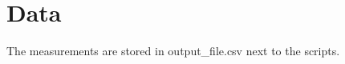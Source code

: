 \documentclass{article}
\begin{document}
\section{Data}
The measurements are stored in output_file.csv next to the scripts.
\end{document}
